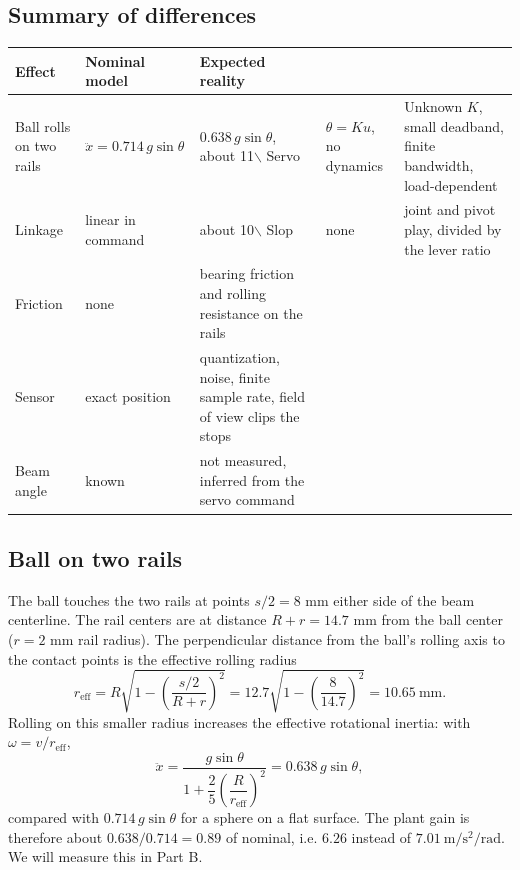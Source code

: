 \documentclass[11pt]{article}
\begin{document}
\subsection{Summary of differences}
\label{sec:orgc46c9fa}
\begin{center}
\begin{tabularx}{\textwidth}{lYY}
Effect & Nominal model & Expected reality\\
\hline
Ball rolls on two rails & \(\ddot{x} = 0.714\,g\sin\theta\) & \(0.638\,g\sin\theta\), about 11$\backslash$%
Servo & \(\theta = K u\), no dynamics & Unknown \(K\), small deadband, finite bandwidth, load-dependent\\
Linkage & linear in command & about 10$\backslash$%
Slop & none & joint and pivot play, divided by the lever ratio\\
Friction & none & bearing friction and rolling resistance on the rails\\
Sensor & exact position & quantization, noise, finite sample rate, field of view clips the stops\\
Beam angle & known & not measured, inferred from the servo command\\
\end{tabularx}
\end{center}
\subsection{Ball on two rails}
\label{sec:org7da71b5}
The ball touches the two rails at points \(s/2 = 8\) mm either side of the beam centerline. The rail centers are at distance \(R + r = 14.7\) mm from the ball center (\(r = 2\) mm rail radius). The perpendicular distance from the ball's rolling axis to the contact points is the effective rolling radius
\begin{equation}
r_{\mathrm{eff}} = R\sqrt{1 - \left(\frac{s/2}{R+r}\right)^{2}} = 12.7\sqrt{1 - \left(\frac{8}{14.7}\right)^{2}} = 10.65\ \mathrm{mm}.
\end{equation}
Rolling on this smaller radius increases the effective rotational inertia: with \(\omega = v / r_{\mathrm{eff}}\),
\begin{equation}
\ddot{x} = \frac{g\sin\theta}{1 + \dfrac{2}{5}\left(\dfrac{R}{r_{\mathrm{eff}}}\right)^{2}} = 0.638\,g\sin\theta ,
\end{equation}
compared with \(0.714\,g\sin\theta\) for a sphere on a flat surface. The plant gain is therefore about \(0.638/0.714 = 0.89\) of nominal, i.e. \(6.26\) instead of \(7.01\ \mathrm{m/s^{2}/rad}\). We will measure this in Part B.
\end{document}
